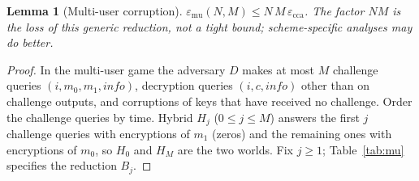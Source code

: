 \documentclass[pdflatex,sn-mathphys-num]{sn-jnl}
\theoremstyle{plain}
\newtheorem{lemma}[theorem]{Lemma}
\theoremstyle{definition}
\begin{document}
\begin{lemma}[Multi-user corruption]\label{lem:mu}
$\varepsilon_{\mathrm{mu}}(N,M)\le N\,M\,\varepsilon_{\mathrm{cca}}$. The factor $NM$ is the loss of this generic reduction, not a tight bound; scheme-specific analyses may do better.
\end{lemma}
\begin{proof}
In the multi-user game the adversary $D$ makes at most $M$ challenge queries $(i,m_0,m_1,\mathit{info})$, decryption queries $(i,c,\mathit{info})$ other than on challenge outputs, and corruptions of keys that have received no challenge. Order the challenge queries by time. Hybrid $H_j$ ($0\le j\le M$) answers the first $j$ challenge queries with encryptions of $m_1$ (zeros) and the remaining ones with encryptions of $m_0$, so $H_0$ and $H_M$ are the two worlds. Fix $j\ge1$; Table~\ref{tab:mu} specifies the reduction $B_j$.


\end{proof}
\end{document}
